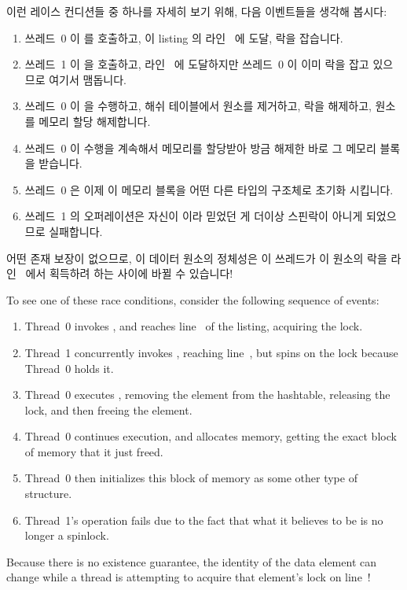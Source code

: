\begin{fcvref}
이런 레이스 컨디션들 중 하나를 자세히 보기 위해, 다음 이벤트들을 생각해 봅시다:
\begin{enumerate}
	\item	쓰레드~0 이  를 호출하고, 이 listing 의
		라인~ 에 도달, 락을 잡습니다.
	\item	쓰레드~1 이  을 호출하고, 라인~ 에
		도달하지만 쓰레드~0 이 이미 락을 잡고 있으므로 여기서
		맴돕니다.
	\item	쓰레드~0 이  을 수행하고, 해쉬
		테이블에서 원소를 제거하고, 락을 해제하고, 원소를 메모리 할당
		해제합니다.
	\item	쓰레드~0 이 수행을 계속해서 메모리를 할당받아 방금 해제한 바로
		그 메모리 블록을 받습니다.
	\item	쓰레드~0 은 이제 이 메모리 블록을 어떤 다른 타입의 구조체로
		초기화 시킵니다.
	\item	쓰레드~1 의  오퍼레이션은 자신이 
		이라 믿었던 게 더이상 스핀락이 아니게 되었으므로 실패합니다.
\end{enumerate}
어떤 존재 보장이 없으므로, 이 데이터 원소의 정체성은 이 쓰레드가 이 원소의 락을
라인~ 에서 획득하려 하는 사이에 바뀔 수 있습니다!
\end{fcvref}

\iffalse

\begin{fcvref}
To see one of these race conditions, consider the following sequence
of events:
\begin{enumerate}
\item	Thread~0 invokes , and reaches line~ of
	the listing, acquiring the lock.
\item	Thread~1 concurrently invokes , reaching
	line~, but spins on the lock because Thread~0 holds it.
\item	Thread~0 executes , removing the element from
	the hashtable, releasing the lock, and then freeing the
	element.
\item	Thread~0 continues execution, and allocates memory, getting
	the exact block of memory that it just freed.
\item	Thread~0 then initializes this block of memory as some
	other type of structure.
\item	Thread~1's  operation fails due to the
	fact that what it believes to be  is no longer
	a spinlock.
\end{enumerate}
Because there is no existence guarantee, the identity of the
data element can change while a thread is attempting to acquire
that element's lock on line~!
\end{fcvref}

